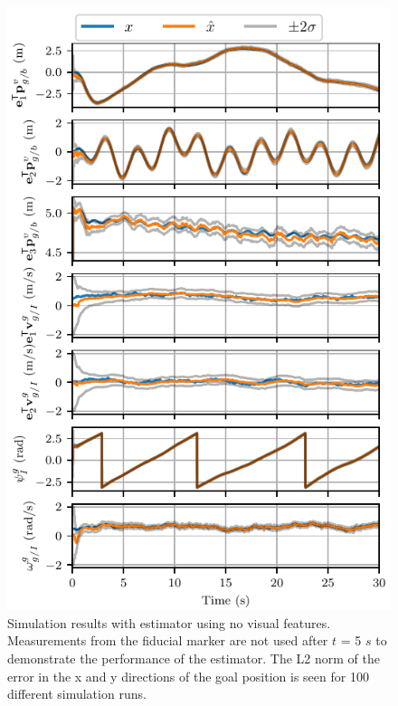 \begin{figure}
  \centering
  \includegraphics[width=6.5in]{plots/single_run_with_lms}
  \caption{Simulation results with estimator using no visual
  features. Measurements from the fiducial marker are not used after $t$ = 5
$s$ to demonstrate the performance of the estimator. The L2 norm of the error in
the x and y directions of the goal position is seen for 100 different simulation
runs.}
  \label{fig:mc_no_lms_xy_err}
\end{figure}

